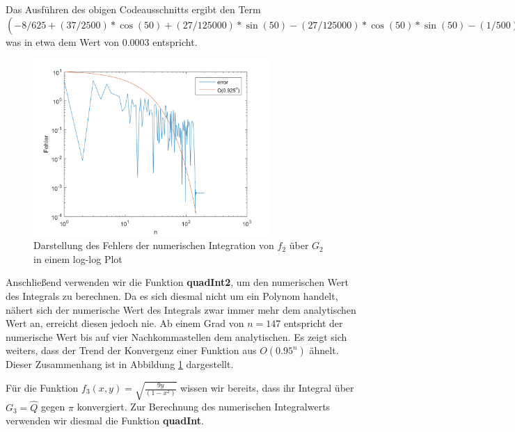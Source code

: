 \documentclass[a4paper,11pt,bibliography=totoc,listof=totoc,headinclude=true,cleardoublepage=empty,oneside]{scrbook}
\begin{document}
\pagebreak \noindent Das Ausführen des obigen Codeausschnitts ergibt den Term $(-8/625+(37/2500)*\cos(50)+(27/125000)*\sin(50)-(27/125000)*\cos(50)*\sin(50)-(1/500)*\cos(50)^2)$ was in etwa dem Wert von 0.0003 entspricht. 


\begin{figure}[h!]
	\centering
	\includegraphics[width=0.8\textwidth]{plot_3_5_2.png}
	\caption{Darstellung des Fehlers der numerischen Integration von $f_2$ über $G_2$ in einem log-log Plot}
	\label{fig:3_5_2}
\end{figure}

\noindent Anschließend verwenden wir die Funktion \textbf{quadInt2}, um den numerischen Wert des Integrals zu berechnen.  Da es sich diesmal nicht um ein Polynom handelt, nähert sich der numerische Wert des Integrals zwar immer mehr dem analytischen Wert an, erreicht diesen jedoch nie. Ab einem Grad von $n=147$ entspricht der numerische Wert bis auf vier Nachkommastellen dem analytischen. Es zeigt sich weiters, dass der Trend der Konvergenz einer Funktion aus $O(0.95^n)$ ähnelt. Dieser Zusammenhang ist in Abbildung \ref{fig:3_5_2} dargestellt.


\begin{minipage}{\textwidth}	
	\color{change}
	\lstset{ 
		language=Matlab, 
		showstringspaces=false}
	 
\end{minipage}


	
	
\pagebreak
Für die Funktion $f_3(x,y)= \sqrt{\frac{9y}{(1-x^2)}}$ wissen wir bereits, dass ihr Integral über $G_3=\hat{Q}$ gegen $\pi$ konvergiert. Zur Berechnung des numerischen Integralwerts verwenden wir diesmal die Funktion \textbf{quadInt}. 

\begin{minipage}{\textwidth}	
	\color{change}
	\lstset{ 
		language=Matlab, 
		showstringspaces=false}
	 
\end{minipage}
\end{document}
